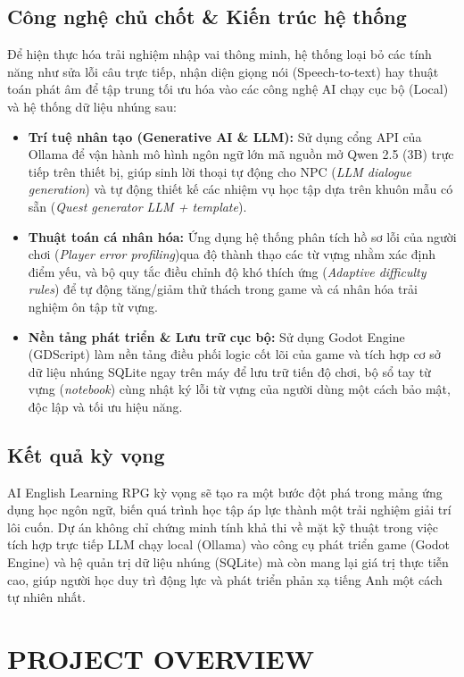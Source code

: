 \subsection{Công nghệ chủ chốt \& Kiến trúc hệ thống}
Để hiện thực hóa trải nghiệm nhập vai thông minh, hệ thống loại bỏ các tính năng như sửa lỗi câu trực tiếp, nhận diện giọng nói (Speech-to-text) hay thuật toán phát âm để tập trung tối ưu hóa vào các công nghệ AI chạy cục bộ (Local) và hệ thống dữ liệu nhúng sau:
\begin{itemize}
    \item \textbf{Trí tuệ nhân tạo (Generative AI \& LLM):} Sử dụng cổng API của Ollama để vận hành mô hình ngôn ngữ lớn mã nguồn mở Qwen 2.5 (3B) trực tiếp trên thiết bị, giúp sinh lời thoại tự động cho NPC (\textit{LLM dialogue generation}) và tự động thiết kế các nhiệm vụ học tập dựa trên khuôn mẫu có sẵn (\textit{Quest generator LLM + template}).
    \item \textbf{Thuật toán cá nhân hóa:} Ứng dụng hệ thống phân tích hồ sơ lỗi của người chơi (\textit{Player error profiling})qua độ thành thạo các từ vựng nhằm xác định điểm yếu, và bộ quy tắc điều chỉnh độ khó thích ứng (\textit{Adaptive difficulty rules}) để tự động tăng/giảm thử thách trong game và cá nhân hóa trải nghiệm ôn tập từ vựng.
    \item \textbf{Nền tảng phát triển \& Lưu trữ cục bộ:} Sử dụng Godot Engine (GDScript) làm nền tảng điều phối logic cốt lõi của game và tích hợp cơ sở dữ liệu nhúng SQLite ngay trên máy để lưu trữ tiến độ chơi, bộ sổ tay từ vựng (\textit{notebook}) cùng nhật ký lỗi từ vựng của người dùng một cách bảo mật, độc lập và tối ưu hiệu năng.
\end{itemize}

\subsection{Kết quả kỳ vọng}
AI English Learning RPG kỳ vọng sẽ tạo ra một bước đột phá trong mảng ứng dụng học ngôn ngữ, biến quá trình học tập áp lực thành một trải nghiệm giải trí lôi cuốn. Dự án không chỉ chứng minh tính khả thi về mặt kỹ thuật trong việc tích hợp trực tiếp LLM chạy local (Ollama) vào công cụ phát triển game (Godot Engine) và hệ quản trị dữ liệu nhúng (SQLite) mà còn mang lại giá trị thực tiễn cao, giúp người học duy trì động lực và phát triển phản xạ tiếng Anh một cách tự nhiên nhất.


\section{PROJECT OVERVIEW}


